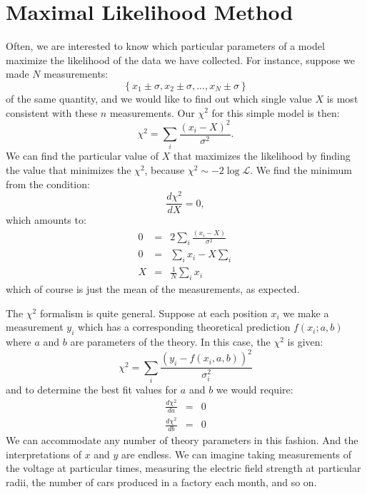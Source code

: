 \documentclass[12pt]{article}
\begin{document}
\section{Maximal Likelihood Method}

Often, we are interested to know which particular parameters of a model maximize the likelihood
of the data we have collected.  For instance, suppose we made $N$ measurements:
\begin{displaymath}
\left\{ x_1 \pm \sigma, x_2 \pm \sigma, ..., x_N \pm \sigma \right\}
\end{displaymath}
of the same quantity, and we would like to find out which single value $X$ is most consistent with these $n$ measurements.  Our $\chi^2$ for this simple model is then:
\begin{displaymath}
\chi^2 = \sum_i \frac{(x_i-X)^2}{\sigma^2}.
\end{displaymath}
We can find the particular value of $X$ that maximizes the likelihood by finding the value that minimizes the $\chi^2$, because $\chi^2 \sim - 2 \log \mathcal{L}$.  We find the minimum from the condition:
\begin{displaymath}
\frac{d\chi^2}{dX} = 0,
\end{displaymath}
which amounts to:
\begin{eqnarray}
0 &=& 2 \sum_i \frac{(x_i-X)}{\sigma^2} \nonumber \\
0 &=& \sum_i x_i - X \sum_i \nonumber \\
X &=& \frac{1}{N} \sum_i x_i \label{eqn:mean}
\end{eqnarray}
which of course is just the mean of the measurements, as expected.

The $\chi^2$ formalism is quite general.  Suppose at each position $x_i$ we make a measurement $y_i$ which has a corresponding theoretical prediction $f(x_i; a, b)$ where $a$ and $b$ are parameters of the theory.  In this case, the $\chi^2$ is given:
\begin{displaymath}
\chi^2 = \sum_i \frac{(y_i-f(x_i,a,b))^2}{\sigma_i^2}
\end{displaymath}
and to determine the best fit values for $a$ and $b$ we would require:
\begin{eqnarray*}
\frac{d\chi^2}{da} &=& 0 \\
\frac{d\chi^2}{db} &=& 0 
\end{eqnarray*}
We can accommodate any number of theory parameters in this fashion.  And the interpretations of $x$ and $y$ are endless.  We can imagine taking measurements of the voltage at particular times, measuring the electric field strength at particular radii, the number of cars produced in a factory each month, and so on.
\end{document}
